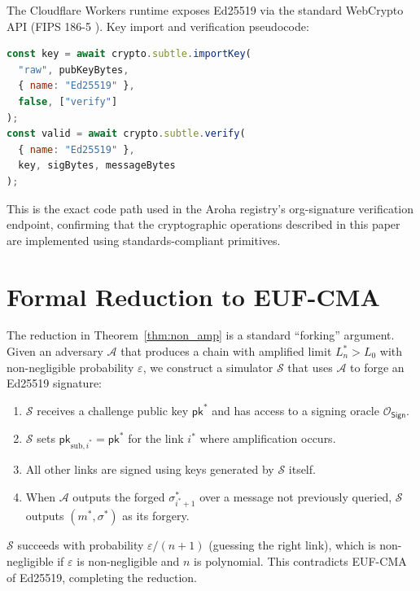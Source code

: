 \documentclass[conference]{IEEEtran}
\newcommand{\Adv}{\mathcal{A}}
\newcommand{\pk}{\mathsf{pk}}
\newcommand{\sig}{\sigma}
\newcommand{\Sign}{\mathsf{Sign}}
\begin{document}
The Cloudflare Workers runtime exposes Ed25519 via the
standard WebCrypto API (FIPS 186-5 \cite{fips186}).
Key import and verification pseudocode:

\begin{lstlisting}[language=JavaScript,basicstyle=\small\ttfamily]
const key = await crypto.subtle.importKey(
  "raw", pubKeyBytes,
  { name: "Ed25519" },
  false, ["verify"]
);
const valid = await crypto.subtle.verify(
  { name: "Ed25519" },
  key, sigBytes, messageBytes
);
\end{lstlisting}

This is the exact code path used in the Aroha registry's
org-signature verification endpoint, confirming that
the cryptographic operations described in this paper are
implemented using standards-compliant primitives.

\section{Formal Reduction to EUF-CMA}
\label{app:reduction}

The reduction in Theorem~\ref{thm:non_amp} is a standard
``forking'' argument. Given an adversary $\Adv$ that
produces a chain with amplified limit $L_n^* > L_0$ with
non-negligible probability $\varepsilon$, we construct a
simulator $\mathcal{S}$ that uses $\Adv$ to forge an
Ed25519 signature:

\begin{enumerate}
  \item $\mathcal{S}$ receives a challenge public key
    $\pk^*$ and has access to a signing oracle
    $\mathcal{O}_{\Sign}$.
  \item $\mathcal{S}$ sets $\pk_{\text{sub},i^*} = \pk^*$
    for the link $i^*$ where amplification occurs.
  \item All other links are signed using keys generated by
    $\mathcal{S}$ itself.
  \item When $\Adv$ outputs the forged $\sig_{i^*+1}^*$
    over a message not previously queried, $\mathcal{S}$
    outputs $(m^*, \sig^*)$ as its forgery.
\end{enumerate}

$\mathcal{S}$ succeeds with probability $\varepsilon /
(n+1)$ (guessing the right link), which is non-negligible
if $\varepsilon$ is non-negligible and $n$ is polynomial.
This contradicts EUF-CMA of Ed25519, completing the
reduction.
\end{document}
